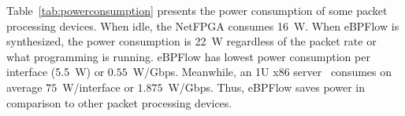 
Table~\ref{tab:powerconsumption} presents the power consumption of some packet processing devices. When idle, the NetFPGA consumes 16~W. When eBPFlow is synthesized, the power consumption is 22~W regardless of the packet rate or what programming is running. 
eBPFlow has lowest power consumption per interface (5.5~W) or $0.55$~W/Gbps. Meanwhile, an 1U x86 server~\cite{x86serverIBM} consumes on average $75$~W/interface or $1.875$~W/Gbps.
Thus, eBPFlow saves power in comparison to other packet processing devices.






